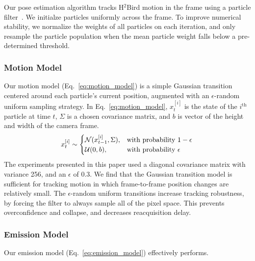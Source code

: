 \documentclass{aamas2013}
\begin{document}
Our pose estimation algorithm tracks H$^2$Bird motion in the frame using a 
particle filter~\cite{thrun2005probabilistic}. We initialze particles 
uniformly across the frame. To improve numerical stability, we  normalize the 
weights of all particles on each iteration, and only resample the particle 
population when the mean particle weight falls below a pre-determined 
threshold.

\subsubsection{Motion Model}
Our motion model (Eq.~\ref{eq:motion_model}) is a simple Gaussian transition 
centered around each particle's current position, augmented with an 
$\epsilon$-random uniform sampling strategy. In Eq.~\ref{eq:motion_model}, 
$x^{[i]}_t$ is the state of the $i^\text{th}$ particle at time $t$, $\Sigma$ 
is a chosen covariance matrix, and $b$ is vector of the height and width of 
the camera frame.
\begin{equation}
\label{eq:motion_model}
x^{[i]}_t \sim \begin{cases}
\mathcal{N}(x^{[i]}_{t-1}, \Sigma), &\text{with probability } 1-\epsilon \\
\mathcal{U}(0,b),& \text{with probability } \epsilon \\
\end{cases}\\
\end{equation}
The experiments presented in this paper used a diagonal covariance matrix 
with variance 256, and an $\epsilon$ of 0.3. We find that the Gaussian 
transition model is sufficient for tracking motion in which frame-to-frame 
position changes are relatively small. The $\epsilon$-random uniform 
transitions increase tracking robustness, by forcing the filter to always 
sample all of the pixel space. This prevents overconfidence and collapse, 
and decreases reacquisition delay. 

\subsubsection{Emission Model}
Our emission model (Eq.~\ref{eq:emission_model}) effectively performs.



\end{document}
